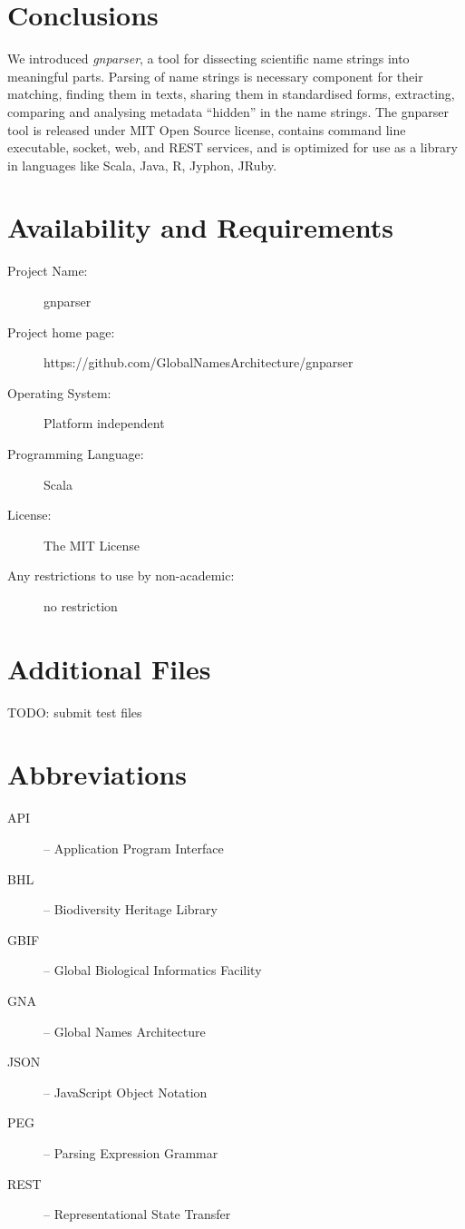 \documentclass{bmcart}
\begin{document}
\section*{Conclusions}

We introduced \textit{gnparser}, a tool for dissecting scientific name strings
into meaningful parts. Parsing of name strings is necessary component for their
matching, finding them in texts, sharing them in standardised forms,
extracting, comparing and analysing metadata ``hidden'' in the name strings.
The gnparser tool is released under MIT Open Source license, contains command
line executable, socket, web, and REST services, and is optimized for use as a
library in languages like Scala, Java, R, Jyphon, JRuby.

\section*{Availability and Requirements}

\begin{description}
  \item[Project Name:] gnparser
  \item[Project home page:] https://github.com/GlobalNamesArchitecture/gnparser
  \item[Operating System:] Platform independent
  \item[Programming Language:] Scala
  \item[License:] The MIT License
  \item[Any restrictions to use by non-academic:] no restriction
\end{description}

\section*{Additional Files}

TODO: submit test files

\section*{Abbreviations}

\begin{description}
  \item[API] -- Application Program Interface
  \item[BHL] -- Biodiversity Heritage Library
  \item[GBIF] -- Global Biological Informatics Facility
  \item[GNA] -- Global Names Architecture
  \item[JSON] -- JavaScript Object Notation
  \item[PEG] -- Parsing Expression Grammar
  \item[REST] -- Representational State Transfer
\end{description}
\end{document}
